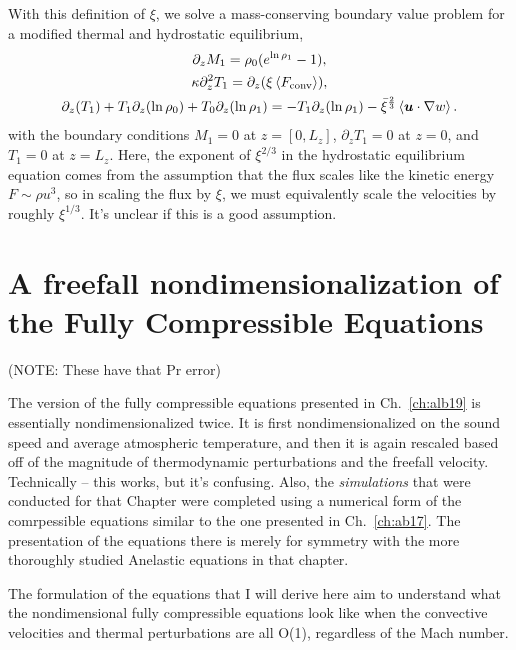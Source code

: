 With this definition of $\xi$, we solve a mass-conserving boundary value problem for a modified thermal and hydrostatic equilibrium,
\begin{gather}
\partial_z M_1 = \rho_0(e^{\ln\rho_1} - 1), \\
\kappa\partial_z^2 T_1 = \partial_z(\xi \left\langle F_{\text{conv}} \right\rangle), \\
\partial_z(T_1) + T_1 \partial_z(\ln\rho_0) + T_0\partial_z(\ln\rho_1) = -T_1\partial_z(\ln\rho_1) - \bar{\xi}^{\frac{2}{3}}\left\langle \bm{u}\cdot\nabla w \right\rangle.
\end{gather}
with the boundary conditions $M_1 = 0$ at $z = [0, L_z]$, $\partial_z T_1 = 0$ at $z = 0$, and $T_1 = 0$ at $z = L_z$.
Here, the exponent of $\xi^{2/3}$ in the hydrostatic equilibrium equation comes from the assumption that the flux scales like the kinetic energy $F \sim \rho u^3$, so in scaling the flux by $\xi$, we must equivalently scale the velocities by roughly $\xi^{1/3}$.
It's unclear if this is a good assumption.


\section{A freefall nondimensionalization of the Fully Compressible Equations}
(NOTE: These have that Pr error)

The version of the fully compressible equations presented in Ch.~\ref{ch:alb19} is essentially nondimensionalized twice.
It is first nondimensionalized on the sound speed and average atmospheric temperature, and then it is again rescaled based off of the magnitude of thermodynamic perturbations and the freefall velocity.
Technically -- this works, but it's confusing.
Also, the \emph{simulations} that were conducted for that Chapter were completed using a numerical form of the comrpessible equations similar to the one presented in Ch.~\ref{ch:ab17}.
The presentation of the equations there is merely for symmetry with the more thoroughly studied Anelastic equations in that chapter.

The formulation of the equations that I will derive here aim to understand what the nondimensional fully compressible equations look like when the convective velocities and thermal perturbations are all O(1), regardless of the Mach number.

